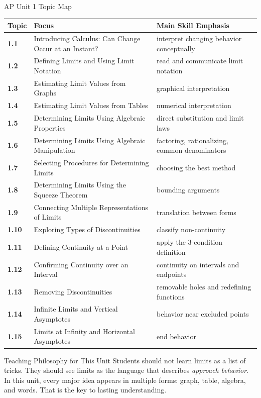 \documentclass[11pt]{article}
\begin{document}
\begin{theorybox}{AP Unit 1 Topic Map}
\renewcommand{\arraystretch}{1.28}
\begin{tabularx}{\textwidth}{>{\bfseries}p{} X >{\raggedright\arraybackslash}p{}}
\toprule
Topic & Focus & Main Skill Emphasis \\
\midrule
1.1 & Introducing Calculus: Can Change Occur at an Instant? & interpret changing behavior conceptually \\
1.2 & Defining Limits and Using Limit Notation & read and communicate limit notation \\
1.3 & Estimating Limit Values from Graphs & graphical interpretation \\
1.4 & Estimating Limit Values from Tables & numerical interpretation \\
1.5 & Determining Limits Using Algebraic Properties & direct substitution and limit laws \\
1.6 & Determining Limits Using Algebraic Manipulation & factoring, rationalizing, common denominators \\
1.7 & Selecting Procedures for Determining Limits & choosing the best method \\
1.8 & Determining Limits Using the Squeeze Theorem & bounding arguments \\
1.9 & Connecting Multiple Representations of Limits & translation between forms \\
1.10 & Exploring Types of Discontinuities & classify non-continuity \\
1.11 & Defining Continuity at a Point & apply the 3-condition definition \\
1.12 & Confirming Continuity over an Interval & continuity on intervals and endpoints \\
1.13 & Removing Discontinuities & removable holes and redefining functions \\
1.14 & Infinite Limits and Vertical Asymptotes & behavior near excluded points \\
1.15 & Limits at Infinity and Horizontal Asymptotes & end behavior \\
\bottomrule
\end{tabularx}
\end{theorybox}

\begin{notebox}{Teaching Philosophy for This Unit}
Students should not learn limits as a list of tricks. They should see limits as the language that describes \emph{approach behavior}. In this unit, every major idea appears in multiple forms: graph, table, algebra, and words. That is the key to lasting understanding.
\end{notebox}
\end{document}
